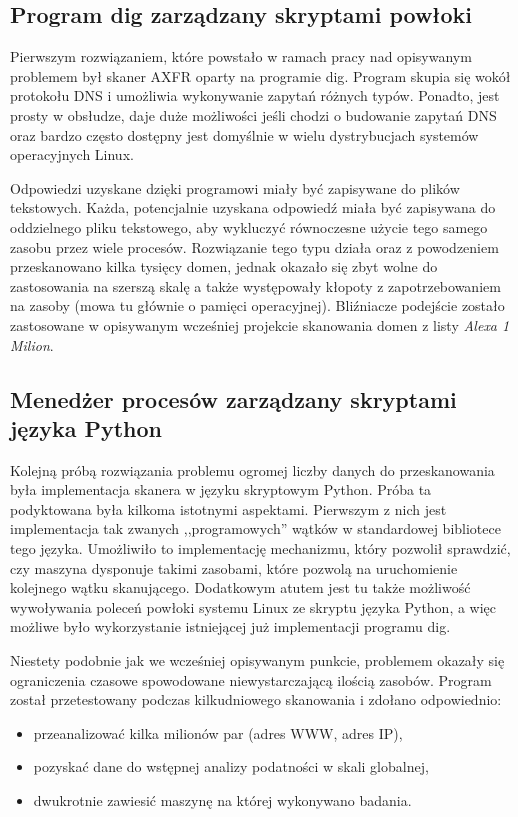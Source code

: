 \subsection{Program dig zarządzany skryptami powłoki}
Pierwszym rozwiązaniem, które powstało w ramach pracy nad opisywanym problemem był skaner AXFR oparty na programie
dig\cite{isc}. Program skupia się wokół protokołu DNS i umożliwia wykonywanie zapytań różnych typów\cite{Liu:2006:DB:1197828}.
Ponadto, jest prosty w obsłudze, daje duże możliwości jeśli chodzi o budowanie zapytań DNS oraz bardzo często dostępny jest
domyślnie w wielu dystrybucjach systemów operacyjnych Linux.

Odpowiedzi uzyskane dzięki programowi miały być zapisywane do plików tekstowych. Każda, potencjalnie uzyskana odpowiedź miała
być zapisywana do oddzielnego pliku tekstowego, aby wykluczyć równoczesne użycie tego samego zasobu przez wiele procesów.
Rozwiązanie tego typu działa oraz z powodzeniem przeskanowano kilka tysięcy domen, jednak okazało się zbyt wolne do zastosowania
na szerszą skalę a także występowały kłopoty z zapotrzebowaniem na zasoby (mowa tu głównie o pamięci operacyjnej). Bliźniacze
podejście zostało zastosowane w opisywanym wcześniej projekcie skanowania domen z listy \textit{Alexa 1 Milion}\cite{scans.io}.

\subsection{Menedżer procesów zarządzany skryptami języka Python}
Kolejną próbą rozwiązania problemu ogromej liczby danych do przeskanowania była implementacja skanera w języku skryptowym Python.
Próba ta podyktowana była kilkoma istotnymi aspektami. Pierwszym z nich jest implementacja tak zwanych ,,programowych'' wątków w
standardowej bibliotece tego języka. Umożliwiło to implementację mechanizmu, który pozwolił sprawdzić, czy maszyna dysponuje
takimi zasobami, które pozwolą na uruchomienie kolejnego wątku skanującego. Dodatkowym atutem jest tu także możliwość wywoływania
poleceń powłoki systemu Linux ze skryptu języka Python, a więc możliwe było wykorzystanie istniejącej już implementacji programu
dig\cite{isc}.

Niestety podobnie jak we wcześniej opisywanym punkcie, problemem okazały się ograniczenia czasowe spowodowane niewystarczającą
ilością zasobów. Program został przetestowany podczas kilkudniowego skanowania i zdołano odpowiednio:
\begin{itemize}
	\item przeanalizować kilka milionów par (adres WWW, adres IP),
	\item pozyskać dane do wstępnej analizy podatności w skali globalnej,
	\item dwukrotnie zawiesić maszynę na której wykonywano badania.
\end{itemize}

